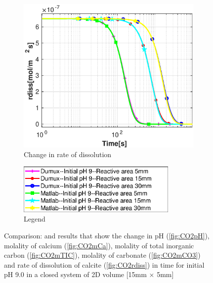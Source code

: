 \begin{figure}
    \hfill
    \begin{subfigure}{.5\linewidth}
            \centering
        \includegraphics[width=\textwidth]{PICTURES/dvm_pH9_rdiss.eps}
        \caption{Change in rate of dissolution}
        \label{fig:dvmpH9rdiss}
    \end{subfigure}%
    \begin{subfigure}{.5\linewidth}
            \centering
        \includegraphics[width=0.85\textwidth]{PICTURES/dvm_pH9_legend.eps}
        \caption{Legend}
        \label{fig:dvmpH9legend}
    \end{subfigure}%
    \caption{Comparison: \DuMuX and \MATLAB results that show the change in pH (\cref{fig:CO2pH}), molality of calcium (\cref{fig:CO2mCa}), molality of total inorganic carbon (\cref{fig:CO2mTIC}), molality of carbonate (\cref{fig:CO2mCO3}) and rate of dissolution of calcite (\cref{fig:CO2rdiss}) in time for initial pH 9.0 in a closed system of 2D volume [15mm $\times$ 5mm]} 
    \label{fig:comparisionDumuxMatlab_pH9.0}
\end{figure}
    
    
\endinput
